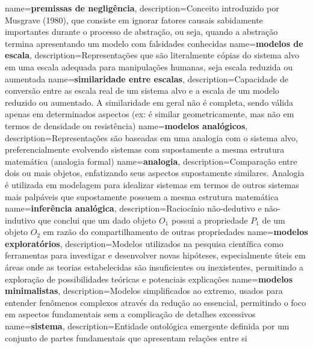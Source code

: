 {
    name=\textbf{premissas de negligência},
    description={Conceito introduzido por Musgrave (1980), que consiste em ignorar fatores causais sabidamente importantes durante o processo de abstração, ou seja, quando a abstração termina apresentando um modelo com falsidades conhecidas}
}
{
    name=\textbf{modelos de escala},
    description={Representações que são literalmente cópias do sistema alvo em uma escala adequada para manipulações humanas, seja escala reduzida ou aumentada}
}
{
    name=\textbf{similaridade entre escalas},
    description={Capacidade de conversão entre as escala real de um sistema alvo e a escala de um modelo reduzido ou aumentado. A similaridade em geral não é completa, sendo válida apenas em determinados aspectos (ex: é similar geometricamente, mas não em termos de densidade ou resistência)}
}
{
    name=\textbf{modelos analógicos},
    description={Representações são baseadas em uma analogia com o sistema alvo, preferencialmente evolvendo sistemas com supostamente a mesma estrutura matemática (analogia formal)}
}
{
    name=\textbf{analogia},
    description={Comparação entre dois ou mais objetos, enfatizando seus aspectos supostamente similares. Analogia é utilizada em modelagem para idealizar sistemas em termos de outros sistemas mais palpáveis que supostamente possuem a mesma estrutura matemática}
}
{
    name=\textbf{inferência analógica},
    description={Raciocínio não-dedutivo e não-indutivo que conclui que um dado objeto $O_1$ possui a propriedade $P_1$ de um objeto $O_2$ em razão do compartilhamento de outras propriedades}
}
{
    name=\textbf{modelos exploratórios},
    description={Modelos utilizados na pesquisa científica como ferramentas para investigar e desenvolver novas hipóteses, especialmente úteis em áreas onde as teorias estabelecidas são insuficientes ou inexistentes, permitindo a exploração de possibilidades teóricas e potenciais explicações}
}
{
    name=\textbf{modelos minimalistas},
    description={Modelos simplificados ao extremo, usados para entender fenômenos complexos através da redução ao essencial, permitindo o foco em aspectos fundamentais sem a complicação de detalhes excessivos}
}
{
    name=\textbf{sistema},
    description={Entidade ontológica emergente definida por um conjunto de partes fundamentais que apresentam relações entre si}
}
